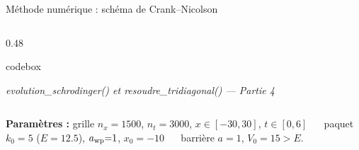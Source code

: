 \documentclass[10pt,aspectratio=169]{beamer}
\newcommand{\codesource}[1]{{\tiny\color{grisdoux}\textit{#1}}}
\begin{document}
\begin{frame}[fragile]{Méthode numérique : schéma de Crank--Nicolson}
\begin{columns}[T]
\begin{column}{0.48\textwidth}
\begin{tcblisting}{codebox}
      \end{tcblisting}
      \endgroup
      \codesource{evolution\_schrodinger() et resoudre\_tridiagonal() --- Partie 4}
    \end{column}
  \end{columns}
  \vspace{-0.05em}
  {\scriptsize\textbf{Paramètres :}
   grille $n_x{=}1500$, $n_t{=}3000$, $x{\in}[-30,30]$, $t{\in}[0,6]$ ~~
   paquet $k_0{=}5$ ($E{=}12.5$), $a_{\rm wp}{=}1$, $x_0{=}-10$ ~~
   barrière $a{=}1$, $V_0{=}15{>}E$.}
\end{frame}
\end{document}
